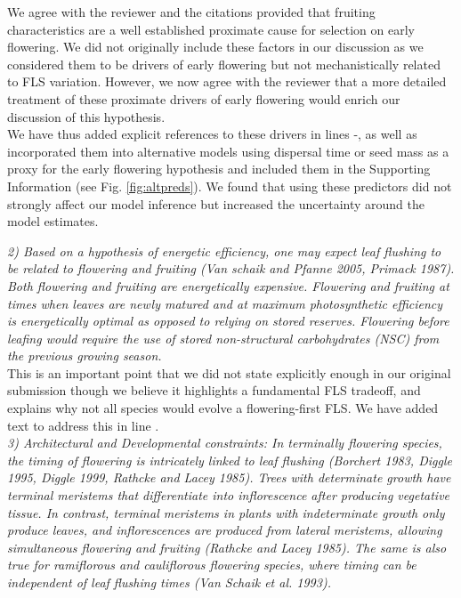 \documentclass{article}[11pt]
\begin{document}
\noindent We agree with the reviewer and the citations provided that fruiting characteristics are a well established proximate cause for selection on early flowering. We did not originally include these factors in our discussion as we considered them to be drivers of early flowering but not mechanistically related to FLS variation. However, we now agree with the reviewer that a more detailed treatment of these proximate drivers of early flowering would enrich our discussion of this hypothesis. \\

We have thus added explicit references to these drivers in lines -, as well as incorporated them into alternative models using dispersal time or seed mass as a proxy for the early flowering hypothesis and included them in the Supporting Information (see Fig. \ref{fig:altpreds}). We found that using these predictors did not strongly affect our model inference but increased the uncertainty around the model estimates.

\emph{2) Based on a hypothesis of energetic efficiency, one may expect leaf flushing to be related to flowering and fruiting (Van schaik and Pfanne 2005, Primack 1987). Both flowering and fruiting are energetically expensive. Flowering and fruiting at times when leaves are newly matured and at maximum photosynthetic efficiency is energetically optimal as opposed to relying on stored reserves. Flowering before leafing would require the use of stored non-structural carbohydrates (NSC) from the previous growing season.}\\

\noindent This is an important point that we did not state explicitly enough in our original submission though we believe it highlights a fundamental FLS tradeoff, and explains why not all species would evolve a flowering-first FLS. We have added text to address this in line .\\

\emph{3) Architectural and Developmental constraints: In terminally flowering species, the timing of flowering is intricately linked to leaf flushing (Borchert 1983, Diggle 1995, Diggle 1999, Rathcke and Lacey 1985). Trees with determinate growth have terminal meristems that differentiate into inflorescence after producing vegetative tissue. In contrast, terminal meristems in plants with indeterminate growth only produce leaves, and inflorescences are produced from lateral meristems, allowing simultaneous flowering and fruiting (Rathcke and Lacey 1985). The same is also true for ramiflorous and cauliflorous flowering species, where timing can be independent of leaf flushing times (Van Schaik et al. 1993).}
\end{document}
